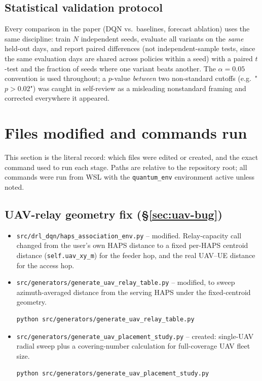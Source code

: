 \documentclass[11pt]{article}
\begin{document}
\subsection{Statistical validation protocol}
Every comparison in the paper (DQN vs.\ baselines, forecast ablation) uses the same
discipline: train $N$ independent seeds, evaluate all variants on the \emph{same}
held-out days, and report paired differences (not independent-sample tests, since the
same evaluation days are shared across policies within a seed) with a paired $t$-test
and the fraction of seeds where one variant beats another. The $\alpha=0.05$ convention
is used throughout; a $p$-value \emph{between} two non-standard cutoffs (e.g.\ "$p>0.02$")
was caught in self-review as a misleading nonstandard framing and corrected everywhere it
appeared.

\section{Files modified and commands run}
This section is the literal record: which files were edited or created, and the exact
command used to run each stage. Paths are relative to the repository root; all commands
were run from WSL with the \texttt{quantum\_env} environment active unless noted.

\subsection{UAV-relay geometry fix (\S\ref{sec:uav-bug})}
\begin{itemize}
  \item \texttt{src/drl\_dqn/haps\_association\_env.py} -- modified. Relay-capacity call
  changed from the user's own HAPS distance to a fixed per-HAPS centroid distance
  (\texttt{self.uav\_xy\_m}) for the feeder hop, and the real UAV--UE distance for the
  access hop.
  \item \texttt{src/generators/generate\_uav\_relay\_table.py} -- modified, to sweep
  azimuth-averaged distance from the serving HAPS under the fixed-centroid geometry.
  \begin{verbatim}
python src/generators/generate_uav_relay_table.py
  \end{verbatim}
  \item \texttt{src/generators/generate\_uav\_placement\_study.py} -- created: single-UAV
  radial sweep plus a covering-number calculation for full-coverage UAV fleet size.
  \begin{verbatim}
python src/generators/generate_uav_placement_study.py
  \end{verbatim}
\end{itemize}
\end{document}
